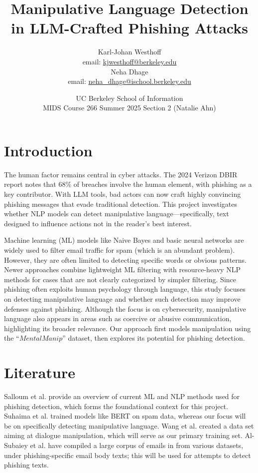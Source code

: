 \documentclass[
	letterpaper, %
	12pt, %
	unnumberedsections, %
	twoside, %
]{LTJournalArticle}
\title{Manipulative Language Detection in LLM-Crafted
Phishing Attacks
}  %
\author{
	Karl-Johan Westhoff \\
	email: \href{mailto:kjwesthoff@berkeley.edu}{kjwesthoff@berkeley.edu} \\
    Neha Dhage \\
	email: \href{mailto:neha_dhage@ischool.berkeley.edu}{neha\_dhage@ischool.berkeley.edu}
}
\date{UC Berkeley School of Information \\
MIDS Course 266 Summer 2025 Section 2 (Natalie Ahn) \\
}
\begin{document}
\maketitle %
\section{Introduction}
The human factor remains central in cyber attacks. The 2024 Verizon DBIR report \cite{verizon2024dbir} notes that 68\% of breaches involve the human element, with phishing as a key contributor. With LLM tools, bad actors can now craft highly convincing phishing messages that evade traditional detection.
This project investigates whether NLP models can detect manipulative language—specifically, text designed to influence actions not in the reader's best interest.

Machine learning (ML) models like Naive Bayes and basic neural networks are widely used to filter email traffic for spam (which is an abundant problem). However, they are often limited to detecting specific words or obvious patterns. Newer approaches combine lightweight ML filtering with resource-heavy NLP methods for cases that are not clearly categorized by simpler filtering. Since phishing often exploits human psychology through language, this study focuses on detecting manipulative language and whether such detection may improve defenses against phishing. Although the focus is on cybersecurity, manipulative language also appears in areas such as coercive or abusive communication, highlighting its broader relevance. Our approach first models manipulation using the “$MentalManip$” dataset, then explores its potential for phishing detection.

\section{Literature}
Salloum et al. \cite{SALLOUM202119} provide an overview of current ML and NLP methods used for phishing detection, which forms the foundational context for this project.
Suhaima et al. \cite{ImprovedPhishing} trained models like BERT on spam data, whereas our focus will be on specifically detecting manipulative language.
Wang et al. \cite{MentalManip} created a data set aiming at dialogue manipulation, which will serve as our primary training set.
Al-Subaiey et al. have compiled a large corpus of emails in \cite{PhishingEmailDataset} from various datasets, under phishing-specific email body texts; this will be used for attempts to detect phishing texts.
\end{document}
